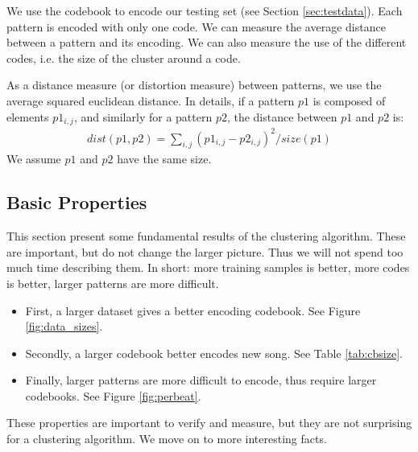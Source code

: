 \documentclass{article}
\begin{document}
We use the codebook to encode our testing set (see Section \ref{sec:testdata}).
Each pattern is encoded with only one code. We can measure the average
distance between a pattern and its encoding. We can also measure the use
of the different codes, i.e. the size of the cluster around a code.

As a distance measure (or distortion measure) between patterns, we use
the average squared euclidean distance. In details, if a pattern $p1$
is composed of elements $p1_{i,j}$, and similarly for a pattern $p2$,
the distance between $p1$ and $p2$ is:
\begin{eqnarray}
  dist(p1,p2) = \sum_{i,j} (p1_{i,j} - p2_{i,j})^2 / size(p1)  \label{eq:dist}
\end{eqnarray}
We assume $p1$ and $p2$ have the same size.


\subsection{Basic Properties}
This section present some fundamental results of the clustering algorithm.
These are important, but do not change the larger picture. Thus we will not
spend too much time describing them. In short: more training samples is
better, more codes is better, larger patterns are more difficult.
\begin{itemize}
\item First, a larger dataset gives a better encoding codebook. See Figure
\ref{fig:data_sizes}.
\item Secondly, a larger codebook better encodes new song. See 
Table \ref{tab:cbsize}.
\item Finally, larger patterns are more difficult to encode, thus require
larger codebooks. See Figure \ref{fig:perbeat}.
\end{itemize}

These properties are important to verify and measure, but they are not
surprising for a clustering algorithm. We move on to more interesting facts.
\end{document}
